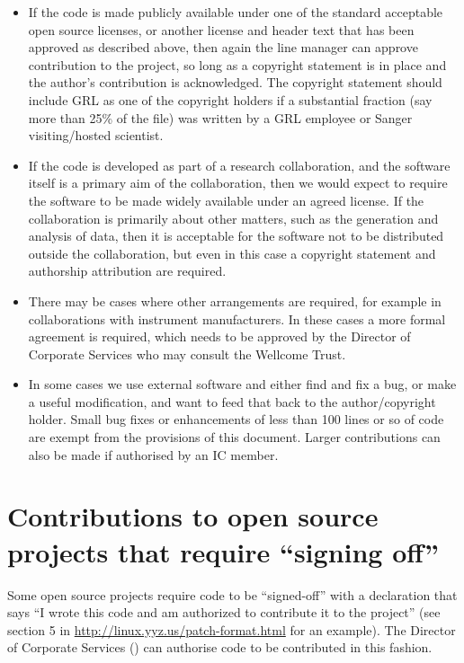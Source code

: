 \documentclass[10pt,a4paper]{article}
\begin{document}
\begin{itemize}
\item If the code is made publicly available under one of the standard acceptable open 
source licenses, or another license and header text that has been approved as 
described above, then again the line manager can approve contribution to the 
project, so long as a copyright statement is in place and the author's contribution 
is acknowledged. The copyright statement should include GRL as one of the 
copyright holders if a substantial fraction (say more than 25\% of the file) was 
written by a GRL employee or Sanger visiting/hosted scientist. 
\item If the code is developed as part of a research collaboration, and the software itself 
is a primary aim of the collaboration, then we would expect to require the 
software to be made widely available under an agreed license. If the 
collaboration is primarily about other matters, such as the generation and 
analysis of data, then it is acceptable for the software not to be distributed 
outside the collaboration, but even in this case a copyright statement and 
authorship attribution are required.
\item There may be cases where other arrangements are required, for example in 
collaborations with instrument manufacturers. In these cases a more formal 
agreement is required, which needs to be approved by the Director of Corporate 
Services who may consult the Wellcome Trust.
\item In some cases we use external software and either find and fix a bug, or make a 
useful modification, and want to feed that back to the author/copyright holder. 
Small bug fixes or enhancements of less than 100 lines or so of code are exempt 
from the provisions of this document. Larger contributions can also be made if 
authorised by an IC member. 
\end{itemize}


\section{Contributions to open source projects that require ``signing off''}

Some open source projects require code to be ``signed-off'' with a declaration that says ``I 
wrote this code and am authorized to contribute it to the project'' (see section 5 in 
\url{http://linux.yyz.us/patch-format.html} for an example). The Director of Corporate 
Services (\docsperson) can authorise code to be contributed in this fashion. 
\end{document}
